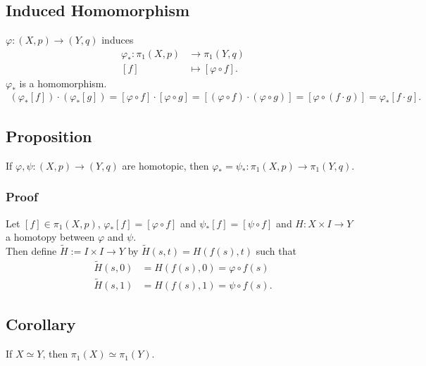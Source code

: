 \documentclass[11pt]{article}
\begin{document}
\subsection*{Induced Homomorphism}
\label{sec:orgc0a1d65}
\(\varphi:(X,p)\to(Y,q)\) induces\\
\begin{align*}
  \varphi_{*}:\pi_{1}(X,p) &\to\pi_{1}(Y,q) \\
  [f]&\mapsto[\varphi\circ f].
\end{align*}
\(\varphi_{*}\) is a homomorphism.\\
\begin{align*}
  (\varphi_{*}[f])\cdot(\varphi_{*}[g])
  =[\varphi\circ f]\cdot[\varphi\circ g]
  =[(\varphi\circ f)\cdot(\varphi\circ g)]
  =[\varphi\circ(f\cdot g)]
  =\varphi_{*}[f\cdot g].
\end{align*}
\subsection*{Proposition}
\label{sec:orga4b8288}
If \(\varphi,\psi:(X,p)\to(Y,q)\) are homotopic, then \(\varphi_{*}=\psi_{*}:\pi_{1}(X,p)\to\pi_{1}(Y,q)\).\\
\subsubsection*{Proof}
\label{sec:org7c8a56b}
Let \([f]\in\pi_{1}(X,p)\), \(\varphi_{*}[f]=[\varphi\circ f]\) and \(\psi_{*}[f]=[\psi\circ f]\) and \(H:X\times I\to Y\) a homotopy between \(\varphi\) and \(\psi\).\\
Then define \(\tilde{H}:=I\times I\to Y\) by \(\tilde{H}(s,t)=H(f(s),t)\) such that\\
\begin{align*}
  \tilde{H}(s,0)&=H(f(s),0)=\varphi\circ f(s) \\
  \tilde{H}(s,1)&=H(f(s),1)=\psi\circ f(s).
\end{align*}
\subsection*{Corollary}
\label{sec:org042564b}
If \(X\simeq Y\), then \(\pi_{1}(X)\simeq\pi_{1}(Y)\).\\
\end{document}
